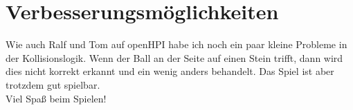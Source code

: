 \documentclass[12pt,a4paper,ngerman]{scrartcl}
\begin{document}
\section{Verbesserungsmöglichkeiten}
Wie auch Ralf und Tom auf openHPI habe ich noch ein paar kleine Probleme in der Kollisionslogik. Wenn der Ball an der Seite auf einen Stein trifft, dann wird dies nicht korrekt erkannt und ein wenig anders behandelt. Das Spiel ist aber trotzdem gut spielbar.\\
Viel Spaß beim Spielen!
\end{document}
